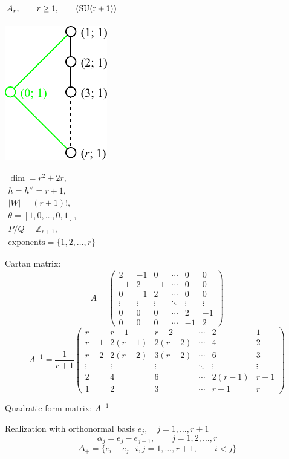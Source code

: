 \documentclass[12pt]{article}
\newcommand{\Zb}{\mathbb{Z}}
\newcommand{\SU}{\rm SU}
\newcommand{\hc}{h^{\vee}}
\begin{document}
\subsection*{$A_r,\qquad r\ge 1,\qquad (\SU(r+1))$}
\parbox{8cm}{\includegraphics{lie_A.pdf}}
$
\begin{array}{l}
 \dim = r^2+2r, \\
 h=\hc= r+1,\\
 |W|=(r+1)!,\\
 \theta=[1,0,\dots,0,1],\\
 P/Q=\Zb_{r+1},\\
 \text{exponents}={\{1,2,\dots,r\}}
\end{array}
$

Cartan matrix:
\[A=\left(
\begin{array}{cccccc}
 2 & -1& 0 &\cdots & 0 & 0 \\
 -1& 2 & -1 &\cdots & 0 & 0 \\
 0 & -1 & 2 &\cdots & 0 & 0 \\
  \vdots&\vdots &\vdots &\ddots &\vdots &\vdots \\
 0&0 &0 &\cdots & 2& -1\\
 0&0 &0 &\cdots & -1& 2
\end{array}
\right)
\]
\[
A^{-1}=\frac{1}{r+1}
\left(
\begin{array}{cccccc}
 r & r-1& r-2 &\cdots & 2 & 1 \\
 r-1& 2(r-1) & 2(r-2) &\cdots & 4 & 2 \\
 r-2& 2(r-2) & 3(r-2) &\cdots & 6 & 3 \\
  \vdots&\vdots &\vdots &\ddots &\vdots &\vdots \\
 2&4 &6 &\cdots & 2(r-1)& r-1\\
 1&2 &3 &\cdots & r-1& r
\end{array}
\right)
\]

Quadratic form matrix: $A^{-1}$

Realization with orthonormal basis $e_j,\quad j=1,\dots,r+1$
\[
 \alpha_{j}=e_j-e_{j+1},\qquad j=1,2,\dots,r
\]
\[
 \Delta_{+}=\{e_i-e_j\ |\ i,j=1,\dots,r+1,\qquad i<j\}
\]
\end{document}
